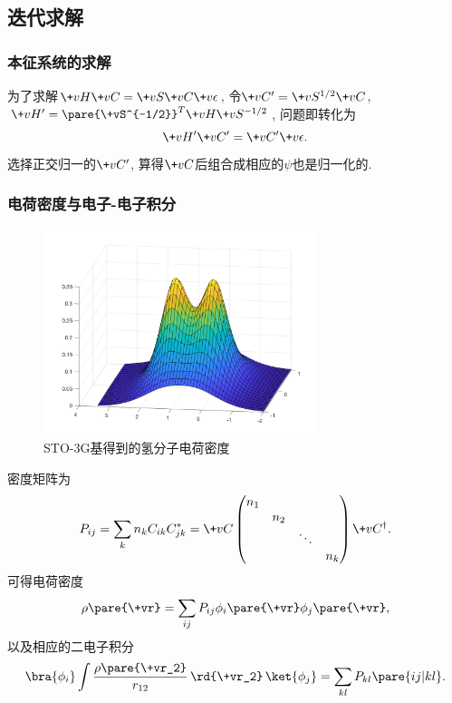 \documentclass[hidelinks]{ctexart}
\begin{document}


\subsection{迭代求解} %
\label{sub:迭代求解}

\subsubsection{本征系统的求解} %
\label{ssub:本征系统的求解}

为了求解$\+vH\+vC = \+vS\+vC\+v\epsilon$, 令$\+vC' = \+vS^{1/2}\+vC$, $\+vH' = \pare{\+vS^{-1/2}}^T\+vH\+vS^{-1/2}$, 问题即转化为
\[ \+vH'\+vC' = \+vC'\+v\epsilon. \]
选择正交归一的$\+vC'$, 算得$\+vC$后组合成相应的$\psi$也是归一化的.


\subsubsection{电荷密度与电子-电子积分} %
\label{ssub:电荷密度与电子_电子积分}

\begin{figure}[ht]
    \centering
    \includegraphics[width=8cm]{src/H2rho.png}
    \caption{STO-3G基得到的氢分子电荷密度}
\end{figure}

密度矩阵为
\[ P_{ij} = \sum_{k} n_k C_{ik} C^*_{jk} = \+vC \begin{pmatrix}
    n_1 & & & \\
    & n_2 & & \\
    & & \ddots & \\
    & & & n_k
\end{pmatrix} \+vC^\dagger. \]
可得电荷密度
\[ \rho\pare{\+vr} = \sum_{ij} P_{ij}\phi_i\pare{\+vr}\phi_j\pare{\+vr}, \]
以及相应的二电子积分
\[ \bra{\phi_i}\int \frac{\rho\pare{\+vr_2}}{r_{12}}\,\rd{\+vr_2}\,\ket{\phi_j} = \sum_{kl} P_{kl}\pare{ij\vert kl}. \]
\end{document}
